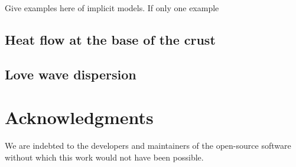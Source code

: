 \documentclass[onecolumn]{article}
\begin{document}
Give examples here of implicit models.
If only one example


\subsection{Heat flow  at the base of the crust}

\subsection{Love wave dispersion}


\section{Acknowledgments}

We are indebted to the developers and maintainers of the open-source
software without which this work would not have been possible.




\end{document}
